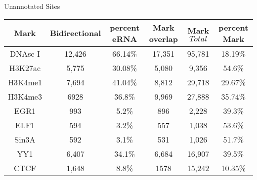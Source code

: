 Unannotated Sites 
\\
\begin{center}
\begin{tabular}{  |c|c|c|c|c|c| } 
 \hline
  	Mark & Bidirectional & percent eRNA & Mark overlap & Mark $Total$   & percent Mark \\ 
\hline
  	DNAse I &  12,426  &  66.14\%  & 17,351  & 95,781   & 18.19\%    \\  %
\hline
  	H3K27ac & 5,775 & 30.08\%  &   5,080 &  9,356 &  54.6\%  \\  %
\hline
  	H3K4me1 & 7,694 & 41.04\%  &   8,812 &   29,718 &  29.67\%  \\  %
\hline
  	H3K4me3 & 6928 & 36.8\%  &   9,969 &  27,888 &  35.74\%  \\  %
\hline
  	EGR1 & 993  & 5.2\%  &   896 &  2,228 &  39.3\%  \\  %
\hline
  	ELF1 & 594 & 3.2\%  &  557 &  1,038&  53.6\%  \\  %
\hline
  	Sin3A & 592 & 3.1\%  &  531 &  1,026&  51.7\%  \\  %
\hline
  	YY1 & 6,407 & 34.1\%  &  6,684 &  16,907&  39.5\%  \\  %
\hline
  	CTCF & 1,648 & 8.8\%  &  1578 &  15,242&  10.35\%  \\  %


\hline
\end{tabular}
\end{center}

